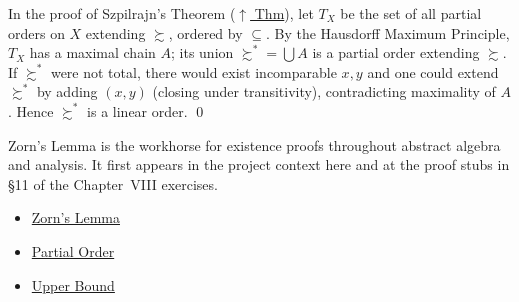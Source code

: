 \begin{remark*}[Exposition]
In the proof of Szpilrajn's Theorem (\hyperref[thm:szpilrajn]{$\uparrow$ Thm}), let
$T_X$ be the set of all partial orders on $X$ extending $\succsim$, ordered
by $\subseteq$. By the Hausdorff Maximum Principle, $T_X$ has a maximal chain
$A$; its union $\succsim^* = \bigcup A$ is a partial order extending
$\succsim$. If $\succsim^*$ were not total, there would exist incomparable
$x, y$ and one could extend $\succsim^*$ by adding $(x,y)$ (closing under
transitivity), contradicting maximality of $A$. Hence $\succsim^*$ is a
linear order. \qed
\end{remark*}

\begin{remark*}[Exposition]
Zorn's Lemma is the workhorse for existence proofs throughout abstract
algebra and analysis. It first appears in the project context here and at
the proof stubs in \S11 of the Chapter~VIII exercises.
\end{remark*}

\begin{dependencies}
\begin{itemize}
  \item \hyperref[thm:zorn]{Zorn's Lemma}
  \item \hyperref[def:partial-order]{Partial Order}
  \item \hyperref[def:upper-bound]{Upper Bound}
\end{itemize}
\end{dependencies}
